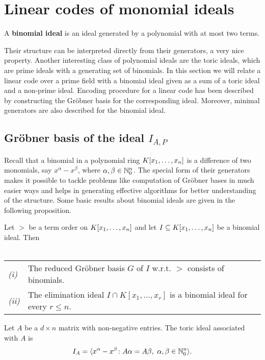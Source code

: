 \documentclass[english,bachelor]{liumaiex}
\begin{document}
\section{Linear codes of monomial ideals}
\begin{define}
A \textbf{binomial ideal} is an ideal generated by a polynomial with at most two terms.
\end{define}
Their structure can be interpreted directly from their generators, a very nice property. Another interesting class of polynomial ideals are the toric ideals, which are prime ideals with a generating set of binomials. In this section we will relate a linear code over a prime field with a binomial ideal given as a sum of a toric ideal and a non-prime ideal. Encoding procedure for a linear code has been described by constructing the Gröbner basis for the corresponding ideal. Moreover, minimal generators are also described for the binomial ideal.
\subsection{Gröbner basis of the ideal $I_{A,P}$}
Recall that a binomial in a polynomial ring $K[x_1,\dots, x_n]$ is a difference of two monomials, say $x^\alpha-x^\beta$, where $\alpha,\beta\in\mathbb{N}_{0}^n$. The special form of their generators makes it possible to tackle problems like computation of Gröbner bases in much easier ways and helps in generating effective algorithms for better understanding of the structure. Some basic results about binomial ideals are given in the following proposition.
\begin{prop}
Let $>$ be a term order on $K[x_1,\dots, x_n]$ and let $I\subseteq K[x_1,\dots, x_n]$ be a binomial ideal. Then\\ \\
\begin{tabular}{ll}
\emph{(i)} & The reduced Gröbner basis $G$ of $I$ w.r.t. $>$ consists of binomials.\\
\emph{(ii)} & The elimination ideal $I\cap K[x_1,\dots,x_r]$ is a binomial ideal for every $r\leq n$.
\end{tabular}
Let $A$ be a $d\times n$ matrix with non-negative entries. The toric ideal associated with $A$ is
\begin{displaymath}
I_A=\langle x^\alpha-x^\beta\colon A\alpha=A\beta, \ \alpha,\beta\in\mathbb{N}_{0}^n\rangle.
\end{displaymath}
\end{prop}

\begin{comment}
\begin{define}
The zero set of $I_A$ in affine $n$-space is called the \textbf{affine toric variety} defined by $I_A$ \cite{fulton}. If all columns of $A$ have the same coordinate sum, then the ideal $I_A$ is homogenous and defines a \textbf{projective toric variety}.
\end{define}
\end{comment}
\end{document}
